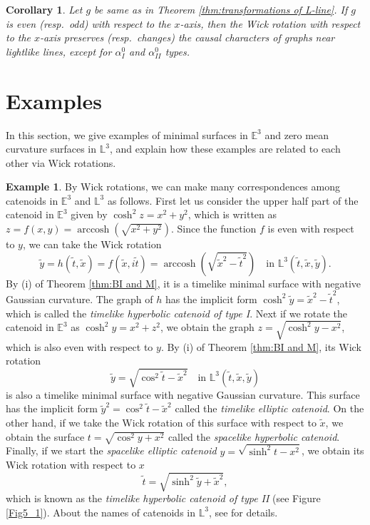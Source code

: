 \documentclass[12pt,amstex]{amsart}%
\theoremstyle{plain} %
\newtheorem{corollary}[theorem]{Corollary}
\theoremstyle{definition}
\newtheorem{example}[theorem]{Example}
\DeclareMathOperator{\arccosh}{arccosh}
\begin{document}
\begin{corollary}\label{Cor:causality_near_lines}
Let $g$ be same as in Theorem \ref{thm:transformations of L-line}. 
If $g$ is even (resp.\ odd) with respect to the $x$-axis, then the Wick rotation with respect to the $x$-axis preserves (resp.\ changes) the causal characters of graphs near lightlike lines, except for $\alpha^0_{I}$ and $\alpha^0_{II}$ types.
\end{corollary}

\section{Examples}\label{Sec.5}
In this section, we give examples of minimal surfaces in $\mathbb{E}^3$ and zero mean curvature surfaces in $\mathbb{L}^3$, and explain how these examples are related to each other via Wick rotations. 
\begin{example}\label{Ex:5.1} By Wick rotations, we can make many correspondences among catenoids in $\mathbb{E}^3$ and $\mathbb{L}^3$ as follows. First let us consider the upper half part of the catenoid in $\mathbb{E}^3$ given by $\cosh^2{z}=x^2+y^2$, which is written as $z=f(x,y)=\arccosh{(\sqrt{x^2+y^2})}$. Since the function $f$ is even with respect to $y$, we can take the Wick rotation
\[
\tilde{y}=h(\tilde{t},\tilde{x})=f(\tilde{x},i\tilde{t})=\arccosh{(\sqrt{\tilde{x}^2-\tilde{t}^2})}\quad \text{in $\mathbb{L}^3(\tilde{t},\tilde{x},\tilde{y})$}.
\]
By (i) of Theorem \ref{thm:BI and M}, it is a timelike minimal surface with negative Gaussian curvature. The graph of $h$ has the implicit form $\cosh^2{\tilde{y}}=\tilde{x}^2-\tilde{t}^2$, which is called the {\it timelike hyperbolic catenoid of type I}. Next if we rotate the catenoid in $\mathbb{E}^3$ as $\cosh^2{y}=x^2+z^2$, we obtain the graph $z=\sqrt{\cosh^2{y}-x^2}$, which is also even with respect to $y$. By (i) of Theorem \ref{thm:BI and M}, its Wick rotation
\[
\tilde{y}=\sqrt{\cos^2{\tilde{t}}-\tilde{x}^2}\quad \text{in $\mathbb{L}^3(\tilde{t},\tilde{x},\tilde{y})$}
\]
is also a timelike minimal surface with negative Gaussian curvature. This surface has the implicit form $\tilde{y}^2=\cos^2{\tilde{t}}-\tilde{x}^2$ called the {\it timelike elliptic catenoid}. On the other hand, if we take the Wick rotation of this surface with respect to $\tilde{x}$, we obtain the surface $t=\sqrt{\cos^2{y}+x^2}$ called the {\it spacelike hyperbolic catenoid}. Finally, if we start the {\it spacelike elliptic catenoid} $y=\sqrt{\sinh^2{t}-x^2}$, we obtain its Wick rotation with respect to $x$
\[
\tilde{t}=\sqrt{\sinh^2{\tilde{y}+\tilde{x}^2}},
\]
which is known as the {\it timelike hyperbolic catenoid of type II} (see Figure \ref{Fig5_1}). About the names of catenoids in $\mathbb{L}^3$, see \cite{KKSY,Lopez} for details.
\end{example}
\end{document}
